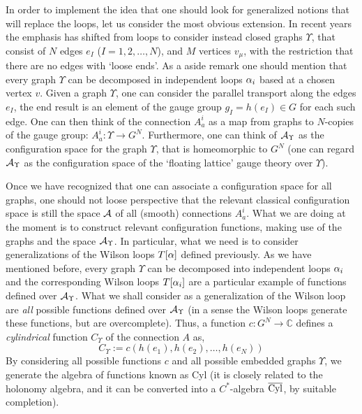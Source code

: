 \documentclass[aps,prd,tightenlines,showpacs,nofootinbib,preprint]{revtex4}
\def\be{\begin{equation}}
\def\ee{\end{equation}}
\begin{document}
In order to implement the idea that one should look for
generalized notions that will replace the loops, let us consider
the most obvious extension. In recent years the emphasis has
shifted from loops to consider instead closed graphs $\Upsilon$,
that consist of $N$ edges  $e_I$ ($I=1,2,\ldots, N$), and $M$
vertices $v_\mu$, with the restriction that there are no edges
with `loose ends'. As a aside remark one should mention that every
graph $\Upsilon$ can be decomposed in independent loops ${\alpha}_i$
based at a chosen vertex $v$. Given  a graph $\Upsilon$, one can
consider the parallel transport along the edges $e_I$, the end
result is an element of the gauge group $g_I=h(e_I)\in G$ for each
such edge. One can then think of the connection $A^i_a$ as a map
from graphs to $N$-copies of the gauge group: $A^i_a:
\Upsilon\rightarrow G^N$. Furthermore, one can think of ${\cal
A}_{\Upsilon}$ as the configuration space  for the graph
$\Upsilon$, that is homeomorphic to $G^N$ (one can regard ${\cal
A}_{\Upsilon}$ as the configuration space of the `floating
lattice' gauge theory over $\Upsilon$).

Once we have recognized that one can associate a configuration
space for all graphs, one should not loose perspective that the
relevant classical configuration space is still the space ${\cal
A}$ of all (smooth) connections $A_a^i$. What we are doing at the
moment is to construct relevant configuration functions, making
use of the graphs and the space ${\cal A}_{\Upsilon}$. In
particular, what we need is to consider generalizations of the
Wilson loops $T[{\alpha}]$ defined previously. As we have mentioned
before, every graph $\Upsilon$ can be decomposed into independent
loops ${\alpha}_i$ and the corresponding Wilson loops $T[{\alpha}_i]$ are a
particular example of functions defined over ${\cal
A}_{\Upsilon}$. What we shall consider as a generalization of the
Wilson loop are {\it all} possible functions defined over ${\cal
A}_{\Upsilon}$ (in a sense the Wilson loops generate these
functions, but are overcomplete). Thus, a function
$c:G^N\rightarrow \mathbb{C}$ defines a {\it cylindrical} function
$C_\Upsilon$ of the connection $A$ as,
%
  \be
C_\Upsilon:= c(h(e_1),h(e_2),\ldots,h(e_N))
  \ee
By considering all possible functions $c$ and all possible
embedded graphs $\Upsilon$, we generate the algebra of functions
known as Cyl (it is closely related to the holonomy algebra, and
it can be converted into a $C^*$-algebra $\overline{\rm Cyl}$, by
suitable completion).
\end{document}
